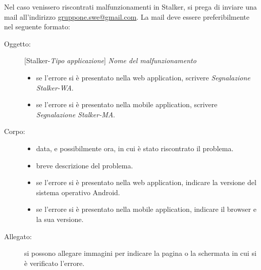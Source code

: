 \documentclass[../manuale-utente.tex]{subfiles}
\begin{document}
Nel caso venissero riscontrati malfunzionamenti in Stalker, si prega di inviare una mail all'indirizzo \href{mailto:gruppone.swe@gmail.com}{gruppone.swe@gmail.com}.
La mail deve essere preferibilmente nel seguente formato:
\begin{description}
    \item[Oggetto:] [Stalker-\textit{Tipo applicazione}] \textit{Nome del malfunzionamento}
    \begin{itemize}
        \item se l'errore si è presentato nella web application, scrivere \textit{Segnalazione Stalker-WA}.
        \item se l'errore si è presentato nella mobile application, scrivere \textit{Segnalazione Stalker-MA}.
    \end{itemize}

    \item[Corpo:]
    \begin{itemize}
        \item data, e possibilmente ora, in cui è stato riscontrato il problema.
        \item breve descrizione del problema.
        \item se l'errore si è presentato nella web application, indicare la versione del sistema operativo Android.
        \item se l'errore si è presentato nella mobile application, indicare il browser e la sua versione.
    \end{itemize}

    \item[Allegato:] si possono allegare immagini per indicare la pagina o la schermata in cui si è verificato l'errore.
\end{description}
\end{document}
